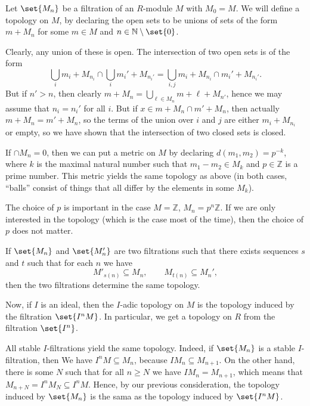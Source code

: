 Let $\set{M_n}$ be a filtration of  an $R$-module $M$ with $M_0 = M$. We will
define a topology on $M$, by declaring the open sets to be unions of sets of the
form $m + M_n$ for some $m \in M$ and $n \in \mathbb{N}\setminus\set{0}$.

Clearly, any union of these is open. The intersection of two open sets is
of the form
\[ \bigcup_i m_i + M_{n_i} \cap \bigcup_i m_i' + M_{n_i'} = \bigcup_{i, j} m_i + M_{n_i} \cap m_i' + M_{n_i'}. \]
But if $n' > n$, then clearly $m + M_n = \bigcup_{\ell \in M_n} m + \ell + M_{n'}$,
hence we may assume that $n_i = n_i'$ for all $i$. But if $x \in m + M_n \cap m' + M_n$,
then actually $m + M_n = m' + M_n$, so the terms of the union over $i$ and $j$ are
either $m_i + M_{n_i}$ or empty, so we have shown that the intersection of two
closed sets is closed.

If $\cap M_n = 0$, then we can put a metric on $M$ by declaring $d(m_1, m_2) = p^{-k}$,
where $k$ is the maximal natural number such that  $m_1 - m_2 \in M_k$ and
$p \in \mathbb{Z}$ is a prime number. This metric yields the same topology as
above (in both cases, \enquote{balls} consist of things that all differ by the elements
in some $M_k$).

The choice of $p$ is important in the case $M = \mathbb{Z}$, $M_n = p^n\mathbb{Z}$.
If we are only interested in the topology (which is the case most of the time),
then the choice of $p$ does not matter.

If $\set{M_n}$ and $\set{M'_n}$ are two filtrations such that
there exists sequences $s$ and $t$ such that for each $n$ we have
\[ M'_{s(n)} \subseteq M_n,\qquad M_{t(n)} \subseteq M_n', \]
then the two filtrations determine the same topology.

Now, if $I$ is an ideal, then the $I$-adic topology on $M$ is the topology induced
by the filtration $\set{I^nM}$. In particular, we get a topology on $R$ from the
filtration $\set{I^n}$.

All stable $I$-filtrations yield the same topology. Indeed, if $\set{M_n}$ is a
stable $I$-filtration, then We have $I^nM \subseteq M_n$, because $IM_n \subseteq M_{n+1}$.
On the other hand, there is some $N$ such that for all $n\geq N$ we have
$IM_n = M_{n+1}$, which means that $M_{n+N} = I^nM_N \subseteq I^nM$. Hence, by
our previous consideration, the topology induced by $\set{M_n}$ is
the sama as the topology induced by $\set{I^nM}$.
